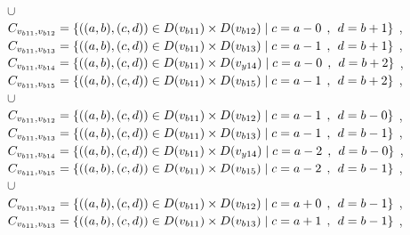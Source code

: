\\$\cup$
\\$C_{v_{b11},v_{b12}}=\{((a,b),(c,d))\in D(v_{b11}) \times D(v_{b12})\mid c = a - 0\hspace{1ex} , \hspace{1ex}  d = b + 1 \}$ , 
\\$C_{v_{b11},v_{b13}}=\{((a,b),(c,d))\in D(v_{b11}) \times D(v_{b13})\mid c = a - 1\hspace{1ex} , \hspace{1ex}  d = b + 1 \}$ , 
\\$C_{v_{b11},v_{b14}}=\{((a,b),(c,d))\in D(v_{b11}) \times D(v_{y14})\mid c = a - 0\hspace{1ex} , \hspace{1ex}  d = b + 2 \}$ , 
\\$C_{v_{b11},v_{b15}}=\{((a,b),(c,d))\in D(v_{b11}) \times D(v_{b15})\mid c = a - 1\hspace{1ex} , \hspace{1ex}  d = b + 2 \}$ , 
\\$\cup$
\\$C_{v_{b11},v_{b12}}=\{((a,b),(c,d))\in D(v_{b11}) \times D(v_{b12})\mid c = a - 1\hspace{1ex} , \hspace{1ex}  d = b - 0 \}$ , 
\\$C_{v_{b11},v_{b13}}=\{((a,b),(c,d))\in D(v_{b11}) \times D(v_{b13})\mid c = a - 1\hspace{1ex} , \hspace{1ex}  d = b - 1 \}$ , 
\\$C_{v_{b11},v_{b14}}=\{((a,b),(c,d))\in D(v_{b11}) \times D(v_{y14})\mid c = a - 2\hspace{1ex} , \hspace{1ex}  d = b - 0 \}$ , 
\\$C_{v_{b11},v_{b15}}=\{((a,b),(c,d))\in D(v_{b11}) \times D(v_{b15})\mid c = a - 2\hspace{1ex} , \hspace{1ex}  d = b - 1 \}$ , 
\\$\cup$
\\$C_{v_{b11},v_{b12}}=\{((a,b),(c,d))\in D(v_{b11}) \times D(v_{b12})\mid c = a + 0\hspace{1ex} , \hspace{1ex}  d = b - 1 \}$ , 
\\$C_{v_{b11},v_{b13}}=\{((a,b),(c,d))\in D(v_{b11}) \times D(v_{b13})\mid c = a + 1\hspace{1ex} , \hspace{1ex}  d = b - 1 \}$ , 
